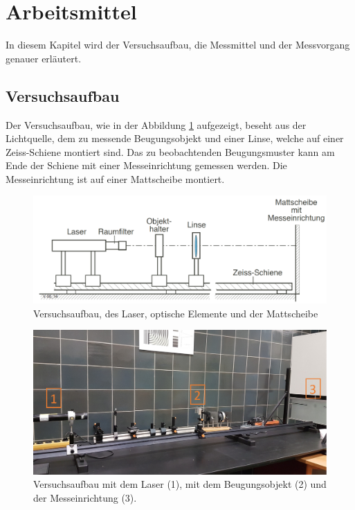 \section{Arbeitsmittel}
In diesem Kapitel wird der Versuchsaufbau, die Messmittel und der Messvorgang genauer erläutert.

\subsection{Versuchsaufbau}
Der Versuchsaufbau, wie in der Abbildung \ref{fig:Versuchsaufbau} aufgezeigt, beseht aus der Lichtquelle, dem zu messende Beugungsobjekt und einer Linse, welche auf einer Zeiss-Schiene montiert sind. Das zu beobachtenden Beugungsmuster kann am Ende der Schiene mit einer Messeinrichtung gemessen werden. Die Messeinrichtung ist auf einer Mattscheibe montiert.

\begin{figure}[h!]
	\centering
	\includegraphics[width=\textwidth]{data/versuchsaufbau}
	\caption{Versuchsaufbau, des Laser, optische Elemente und der Mattscheibe}
	\label{fig:Versuchsaufbau}
\end{figure}

\begin{figure}[h!]
	\centering
	\includegraphics[width=\textwidth]{data/aufbau2}
	\caption{Versuchsaufbau mit dem Laser (1), mit dem Beugungsobjekt (2) und der Messeinrichtung (3).}
	\label{fig:org.Versuchsaufbau}
\end{figure}

